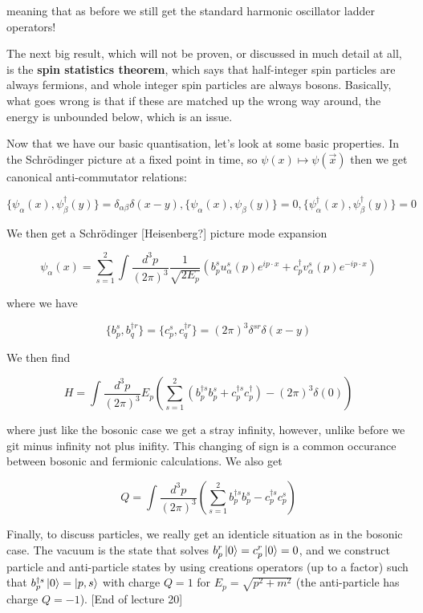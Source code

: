 \documentclass{article}
\theoremstyle{definition}
\begin{document}
meaning that as before we still get the standard harmonic oscillator ladder
operators!

The next big result, which will not be proven, or discussed in much detail at
all, is the \textbf{spin statistics theorem}, which says that half-integer spin
particles are always fermions, and whole integer spin particles are always
bosons. Basically, what goes wrong is that if these are matched up the wrong way
around, the energy is unbounded below, which is an issue.

Now that we have our basic quantisation, let's look at some basic properties. In
the Schr\"{o}dinger picture at a fixed point in time, so $\psi(x) \mapsto
\psi(\vec{x})$ then we get canonical anti-commutator relations:

$$ \{\psi_\alpha(x), \psi^\dagger_\beta(y)\} = \delta_{\alpha \beta} \delta(x -
y), \{\psi_\alpha(x), \psi_\beta(y)\} = 0, \{\psi_\alpha^\dagger(x),
\psi_\beta^\dagger(y)\} = 0 $$

We then get a Schr\"{o}dinger [Heisenberg?] picture mode expansion

$$ \psi_\alpha(x) = \sum_{s = 1}^2 \int \frac{d^3p}{(2\pi)^3}
\frac{1}{\sqrt{2E_p}} \left( b^s_p u^s_\alpha(p) e^{ip \cdot x} + c^\dagger_p
  v^s_\alpha(p) e^{-ip \cdot x} \right) $$

where we have

$$ \{b^s_p, b^{\dagger r}_q\} = \{c^s_p, c^{\dagger r}_q\} = (2\pi)^3
\delta^{sr} \delta(x - y) $$

We then find

$$ H = \int \frac{d^3p}{(2\pi)^3} E_p \left( \sum_{s = 1}^2 (b_p^{\dagger s}
  b_p^s + c_p^{\dagger s} c_p^\dagger) - (2\pi)^3 \delta(0) \right) $$

where just like the bosonic case we get a stray infinity, however, unlike before
we git minus infinity not plus inifity. This changing of sign is a common
occurance between bosonic and fermionic calculations. We also get

$$ Q = \int \frac{d^3p}{(2\pi)^3} \left( \sum_{s = 1}^2 b^{\dagger s}_p b^s_p -
  c^{\dagger s}_p c^s_p \right) $$

Finally, to discuss particles, we really get an identicle situation as in the
bosonic case. The vacuum is the state that solves $b_p^r \ket{0} = c_p^r \ket{0}
= 0$, and we construct particle and anti-particle states by using creations
operators (up to a factor) such that $b^{\dagger s}_p \ket{0} = \ket{p, s}$ with
charge $Q = 1$ for $E_p = \sqrt{p^2 + m^2}$ (the anti-particle has charge $Q =
-1$). [End of lecture 20]
\end{document}
